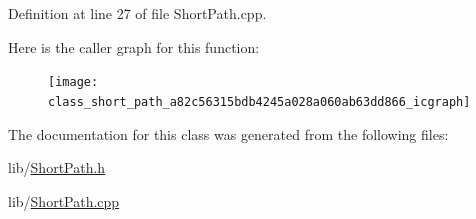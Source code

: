 Definition at line 27 of file Short\-Path.\-cpp.



Here is the caller graph for this function\-:
\nopagebreak
\begin{figure}[H]
\begin{center}
\leavevmode
\texttt{[image: class\_short\_path\_a82c56315bdb4245a028a060ab63dd866\_icgraph]}
\end{center}
\end{figure}




The documentation for this class was generated from the following files\-:\begin{DoxyCompactItemize}
\item 
lib/\hyperlink{_short_path_8h}{Short\-Path.\-h}\item 
lib/\hyperlink{_short_path_8cpp}{Short\-Path.\-cpp}\end{DoxyCompactItemize}
